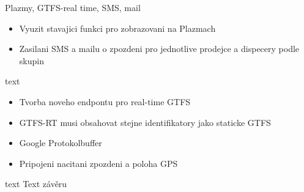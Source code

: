 Plazmy, GTFS-real time, SMS, mail

\begin{itemize}
	\item Vyuzit stavajici funkci pro zobrazovani na Plazmach
	\item Zasilani SMS a mailu o zpozdeni pro jednotlive prodejce a dispecery podle skupin
\end{itemize}

text

\begin{itemize}
	\item Tvorba noveho endpontu pro real-time GTFS
	\item GTFS-RT musi obsahovat stejne identifikatory jako staticke GTFS
	\item Google Protokolbuffer
	\item Pripojeni nacitani zpozdeni a poloha GPS
\end{itemize}

text
Text závěru


